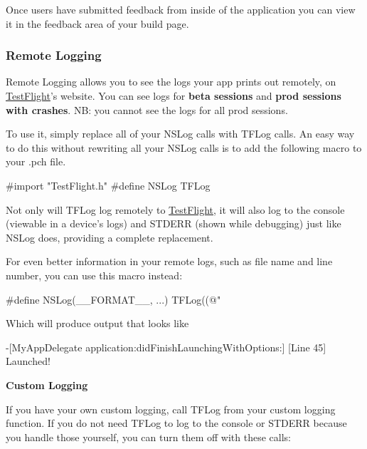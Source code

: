 Once users have submitted feedback from inside of the application you can view it in the feedback area of your build page.

\subsubsection*{Remote Logging}

Remote Logging allows you to see the logs your app prints out remotely, on \hyperlink{interface_test_flight}{Test\-Flight}'s website. You can see logs for {\bfseries beta sessions} and {\bfseries prod sessions with crashes}. N\-B\-: you cannot see the logs for all prod sessions.

To use it, simply replace all of your {\ttfamily N\-S\-Log} calls with {\ttfamily T\-F\-Log} calls. An easy way to do this without rewriting all your {\ttfamily N\-S\-Log} calls is to add the following macro to your {\ttfamily .pch} file. \begin{DoxyVerb}#import "TestFlight.h"
#define NSLog TFLog
\end{DoxyVerb}


Not only will {\ttfamily T\-F\-Log} log remotely to \hyperlink{interface_test_flight}{Test\-Flight}, it will also log to the console (viewable in a device's logs) and S\-T\-D\-E\-R\-R (shown while debugging) just like N\-S\-Log does, providing a complete replacement.

For even better information in your remote logs, such as file name and line number, you can use this macro instead\-: \begin{DoxyVerb}#define NSLog(__FORMAT__, ...) TFLog((@"%
\end{DoxyVerb}


Which will produce output that looks like \begin{DoxyVerb}-[MyAppDelegate application:didFinishLaunchingWithOptions:] [Line 45] Launched!
\end{DoxyVerb}


{\bfseries Custom Logging}

If you have your own custom logging, call {\ttfamily T\-F\-Log} from your custom logging function. If you do not need {\ttfamily T\-F\-Log} to log to the console or S\-T\-D\-E\-R\-R because you handle those yourself, you can turn them off with these calls\-: \begin{DoxyVerb}[TestFlight setOptions: TFOptionLogToConsole : @NO }];
[TestFlight setOptions: TFOptionLogToSTDERR : @NO }];
\end{DoxyVerb}


